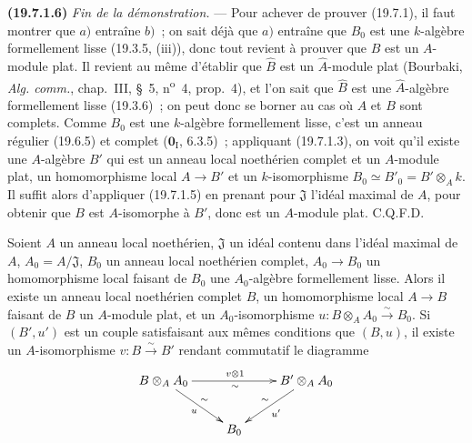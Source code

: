 \medskip
\noindent\textbf{(19.7.1.6)}\enspace
\emph{Fin de la démonstration.} --- Pour achever de prouver (19.7.1), il faut
montrer que $a)$ entraîne $b)$~; on sait déjà que $a)$ entraîne que $B_0$ est
une $k$-algèbre formellement lisse (19.3.5, (iii)), donc tout revient à prouver
que $B$ est un $A$-module plat. Il revient au même d'établir que $\widehat B$
est un $\widehat A$-module plat (Bourbaki, \emph{Alg. comm.}, chap.~III, §~5,
n\textsuperscript{o}~4, prop.~4), et l'on sait que $\widehat B$ est une
$\widehat A$-algèbre formellement lisse (19.3.6)~; on peut donc se borner au
cas où $A$ et $B$ sont complets. Comme $B_0$ est une $k$-algèbre formellement
lisse, c'est un anneau régulier (19.6.5) et complet
($\mathbf 0_{\mathrm I}$, 6.3.5)~; appliquant (19.7.1.3), on voit qu'il existe
une $A$-algèbre $B'$ qui est un anneau local noethérien complet et un
$A$-module plat, un homomorphisme local $A\to B'$ et un $k$-isomorphisme
$B_0\simeq B'_0=B'\otimes_A k$. Il suffit alors d'appliquer (19.7.1.5) en
prenant pour $\mathfrak J$ l'idéal maximal de $A$, pour obtenir que $B$ est
$A$-isomorphe à $B'$, donc est un $A$-module plat. C.Q.F.D.

\begin{theorem}[19.7.2]
\label{0.19.7.2-fr}
Soient $A$ un anneau local noethérien, $\mathfrak J$ un idéal contenu dans
l'idéal maximal de $A$, $A_0=A/\mathfrak J$, $B_0$ un anneau local noethérien
complet, $A_0\to B_0$ un homomorphisme local faisant de $B_0$ une
$A_0$-algèbre formellement lisse. Alors il existe un anneau local noethérien
complet $B$, un homomorphisme local $A\to B$ faisant de $B$ un $A$-module
plat, et un $A_0$-isomorphisme
$u:B\otimes_A A_0\xrightarrow{\sim}B_0$. Si $(B',u')$ est un couple
satisfaisant aux mêmes conditions que $(B,u)$, il existe un $A$-isomorphisme
$v:B\xrightarrow{\sim}B'$ rendant commutatif le diagramme
\[
\xymatrix{
  B\otimes_A A_0\ar[rr]^{v\otimes1}_{\sim}\ar[dr]^{\sim}_u &&
  B'\otimes_A A_0\ar[dl]^{u'}_{\sim} \\
  & B_0
}
\]
\end{theorem}


